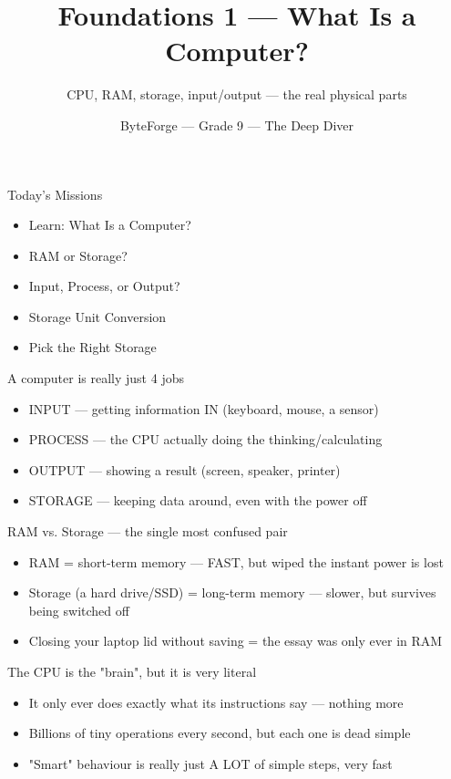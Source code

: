 \documentclass[aspectratio=169]{beamer}
\title{Foundations 1 — What Is a Computer?}
\subtitle{CPU, RAM, storage, input/output — the real physical parts}
\author{ByteForge --- Grade 9 --- The Deep Diver}
\date{}
\begin{document}
\begin{frame}
    \titlepage
\end{frame}

\begin{frame}{Today's Missions}
    \Large
    \begin{itemize}
        \item Learn: What Is a Computer?
        \item RAM or Storage?
        \item Input, Process, or Output?
        \item Storage Unit Conversion
        \item Pick the Right Storage
    \end{itemize}
\end{frame}

\begin{frame}{A computer is really just 4 jobs}
    \large
    \begin{itemize}
        \item INPUT --- getting information IN (keyboard, mouse, a sensor)
        \item PROCESS --- the CPU actually doing the thinking/calculating
        \item OUTPUT --- showing a result (screen, speaker, printer)
        \item STORAGE --- keeping data around, even with the power off
    \end{itemize}
\end{frame}


\begin{frame}{RAM vs. Storage --- the single most confused pair}
    \large
    \begin{itemize}
        \item RAM = short-term memory --- FAST, but wiped the instant power is lost
        \item Storage (a hard drive/SSD) = long-term memory --- slower, but survives being switched off
        \item Closing your laptop lid without saving = the essay was only ever in RAM
    \end{itemize}
\end{frame}


\begin{frame}{The CPU is the "brain", but it is very literal}
    \large
    \begin{itemize}
        \item It only ever does exactly what its instructions say --- nothing more
        \item Billions of tiny operations every second, but each one is dead simple
        \item "Smart" behaviour is really just A LOT of simple steps, very fast
    \end{itemize}
\end{frame}
\end{document}
